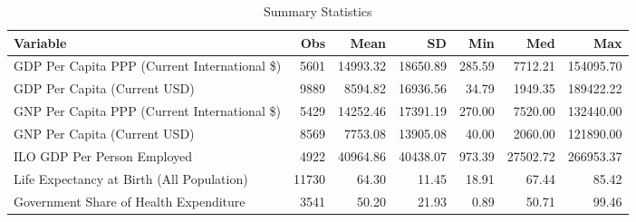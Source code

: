 \begin{table}
\centering
\caption{Summary Statistics}
\label{Sum_Stats}
\begin{tabular}{lrrrrrr}
\toprule
                                    Variable &   Obs &     Mean &       SD &    Min &      Med &       Max \\
\midrule
GDP Per Capita PPP (Current International \$) & 5601 & 14993.32 & 18650.89 & 285.59 & 7712.21 & 154095.70 \\
GDP Per Capita (Current USD) & 9889 & 8594.82 & 16936.56 & 34.79 & 1949.35 & 189422.22 \\
GNP Per Capita PPP (Current International \$) & 5429 & 14252.46 & 17391.19 & 270.00 & 7520.00 & 132440.00 \\
GNP Per Capita (Current USD) & 8569 & 7753.08 & 13905.08 & 40.00 & 2060.00 & 121890.00 \\
ILO GDP Per Person Employed & 4922 & 40964.86 & 40438.07 & 973.39 & 27502.72 & 266953.37 \\
Life Expectancy at Birth (All Population) & 11730 & 64.30 & 11.45 & 18.91 & 67.44 & 85.42 \\
Government Share of Health Expenditure & 3541 & 50.20 & 21.93 & 0.89 & 50.71 & 99.46 \\
\bottomrule
\end{tabular}
\end{table}
